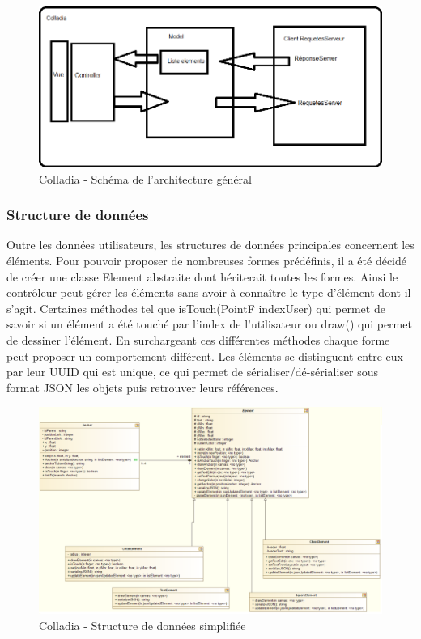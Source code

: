	\vspace*{\fill}
	\begin{figure}[!h]
		\centering
		\includegraphics[width=.7\textwidth]{img/archiGeneral}
		\caption{Colladia - Schéma de l'architecture général}
	\end{figure}
	\vspace*{\fill}
	
\newpage
\subsubsection{Structure de données}
Outre les données utilisateurs, les structures de données principales concernent les éléments.
Pour pouvoir proposer de nombreuses formes prédéfinis, il a été décidé de créer une classe Element abstraite dont hériterait toutes les formes.
Ainsi le contrôleur peut gérer les éléments sans avoir à connaître le type d'élément dont il s'agit.
Certaines méthodes tel que isTouch(PointF indexUser) qui permet de savoir si un élément a été touché par l'index de l'utilisateur ou draw() qui permet de dessiner l'élément.
En surchargeant ces différentes méthodes chaque forme peut proposer un comportement différent.
Les éléments se distinguent entre eux par leur UUID qui est unique, ce qui permet de sérialiser/dé-sérialiser sous format JSON les objets puis retrouver leurs références.

	\vspace*{\fill}
	\begin{figure}[!h]
		\centering
		\includegraphics[width=\textwidth]{img/UmlArchiStructureData}
		\caption{Colladia - Structure de données simplifiée}
	\end{figure}
	\vspace*{\fill}
	
